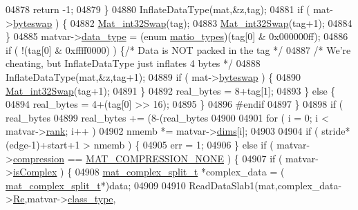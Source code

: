 \begin{DoxyCode}
{{{{{{{{{{{{{{{{{{{{{{{{{{{{{04878             \textcolor{keywordflow}{return} -1;
04879         \}
04880         InflateDataType(mat,&z,tag);
04881         \textcolor{keywordflow}{if} ( mat->\hyperlink{struct__mat__t_a99d207977af5e04941ace56d71817a40}{byteswap} ) \{
04882             \hyperlink{endian_8c_a2e0153996243f0a34df9a5286087cfa3}{Mat\_int32Swap}(tag);
04883             \hyperlink{endian_8c_a2e0153996243f0a34df9a5286087cfa3}{Mat\_int32Swap}(tag+1);
04884         \}
04885         matvar->\hyperlink{group___m_a_t_ab6aafe9bd77f0f077852593dec438144}{data\_type} = (\textcolor{keyword}{enum} \hyperlink{group___m_a_t_gacf7b3b879282b7ab3a51190e49bf3453}{matio\_types})(tag[0] & 0x000000ff);
04886         \textcolor{keywordflow}{if} ( !(tag[0] & 0xffff0000) ) \{\textcolor{comment}{/* Data is NOT packed in the tag */}
04887             \textcolor{comment}{/* We're cheating, but InflateDataType just inflates 4 bytes */}
04888             InflateDataType(mat,&z,tag+1);
04889             \textcolor{keywordflow}{if} ( mat->\hyperlink{struct__mat__t_a99d207977af5e04941ace56d71817a40}{byteswap} ) \{
04890                 \hyperlink{endian_8c_a2e0153996243f0a34df9a5286087cfa3}{Mat\_int32Swap}(tag+1);
04891             \}
04892             real\_bytes = 8+tag[1];
04893         \} \textcolor{keywordflow}{else} \{
04894             real\_bytes = 4+(tag[0] >> 16);
04895         \}
04896 \textcolor{preprocessor}{#endif}
04897     \}
04898     \textcolor{keywordflow}{if} ( real\_bytes %
04899         real\_bytes += (8-(real\_bytes %
04900 
04901     \textcolor{keywordflow}{for} ( i = 0; i < matvar->\hyperlink{group___m_a_t_a84ba70c96ded13cc555fa75b768d9921}{rank}; i++ )
04902         nmemb *= matvar->\hyperlink{group___m_a_t_a8e01234e1c862ce3472bb37f5a09b92c}{dims}[i];
04903 
04904     if ( stride*(edge-1)+start+1 > nmemb ) \{
04905         err = 1;
04906     \} \textcolor{keywordflow}{else} \textcolor{keywordflow}{if} ( matvar->\hyperlink{group___m_a_t_aeef0466048621cb2c959ba7f6c774d06}{compression} == \hyperlink{group___m_a_t_gga768c318af97bd2567758ecb001ceb7f4a2280b97631ff5dd24dec55261dc587b6}{MAT\_COMPRESSION\_NONE} ) \{
04907         \textcolor{keywordflow}{if} ( matvar->\hyperlink{group___m_a_t_aeb03b3a69f108dc05470b00443a43739}{isComplex} ) \{
04908             \hyperlink{group___m_a_t_structmat__complex__split__t}{mat\_complex\_split\_t} *complex\_data = (
      \hyperlink{group___m_a_t_structmat__complex__split__t}{mat\_complex\_split\_t}*)data;
04909 
04910             ReadDataSlab1(mat,complex\_data->\hyperlink{group___m_a_t_a484a93607508adac2bce53a0252e0325}{Re},matvar->\hyperlink{group___m_a_t_aff13035bf3265dd7d9425e5d40c839d4}{class\_type},
}}}}}}}}}}}}}}}}}}}}}}}}}}}}}
\end{DoxyCode}
